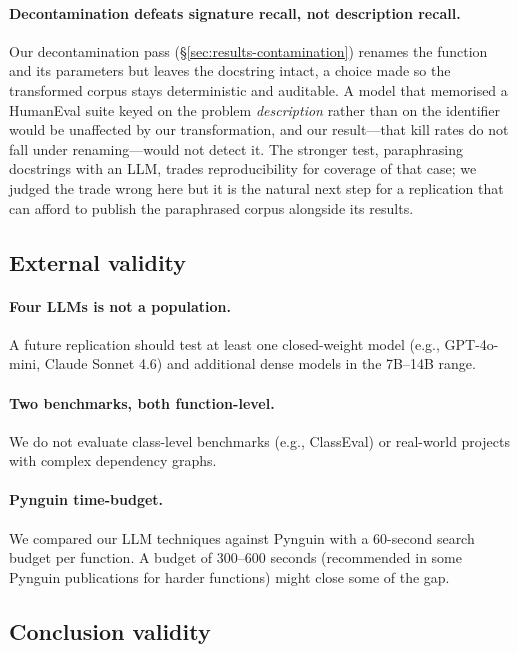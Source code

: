 \documentclass[smallextended]{svjour3}
\begin{document}
\paragraph{Decontamination defeats signature recall, not
description recall.}
Our decontamination pass (\S\ref{sec:results-contamination}) renames
the function and its parameters but leaves the docstring intact, a
choice made so the transformed corpus stays deterministic and
auditable. A model that memorised a HumanEval suite keyed on the
problem \emph{description} rather than on the identifier would be
unaffected by our transformation, and our result---that kill rates
do not fall under renaming---would not detect it. The stronger test,
paraphrasing docstrings with an LLM, trades reproducibility for
coverage of that case; we judged the trade wrong here but it is the
natural next step for a replication that can afford to publish the
paraphrased corpus alongside its results.

\subsection{External validity}\label{sec:limitations-external}

\paragraph{Four LLMs is not a population.}
A future replication should test at least one closed-weight model
(e.g., GPT-4o-mini, Claude Sonnet 4.6) and additional dense
models in the 7B–14B range.

\paragraph{Two benchmarks, both function-level.}
We do not evaluate class-level benchmarks (e.g., ClassEval) or
real-world projects with complex dependency graphs.

\paragraph{Pynguin time-budget.}
We compared our LLM techniques against Pynguin with a 60-second search
budget per function. A budget of 300–600 seconds (recommended in
some Pynguin publications for harder functions) might close some
of the gap.

\subsection{Conclusion validity}\label{sec:limitations-conclusion}
\end{document}
